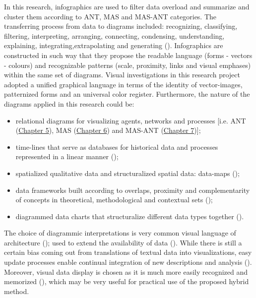 \documentclass[11pt]{report}
\begin{document}
In this research, infographics are used to filter data overload and summarize and cluster them according to ANT, MAS and MAS-ANT categories.
The transferring process from data to diagrams included: recognizing, classifying, filtering, interpreting, arranging, connecting, condensing, understanding, explaining, integrating,extrapolating and generating (\href{McCandless}{\citealt{McCandless}}).
Infographics are constructed in such way that they propose the readable  language (forms - vectors - colours) and recognizable patterns (scale, proximity, links and visual emphases) within the same set of diagrams.
Visual investigations in this research project adopted a unified graphical language in terms of the identity of vector-images, patternized forms and an universal color register.
Furthermore, the nature of the diagrams applied in this research could be:
\begin{itemize}
\item relational diagrams for visualizing agents, networks and processes [i.e. ANT (\href{Chapter 5}{Chapter 5}), MAS (\href{Chapter 6}{Chapter 6}) and MAS-ANT (\href{Chapter 7}{Chapter 7})];
\item time-lines that serve as databases for historical data and processes represented in a linear manner (\href{Rosenberg}{\citealt{Rosenberg and Grafton}});
\item spatialized qualitative data and structuralized spatial data: data-maps (\href{Raisson}{\citealt{Raisson}});
\item data frameworks built according to overlaps, proximity and complementarity of concepts in theoretical, methodological and contextual sets (\href{Caraes}{\citealt{Caraes et al.}});
\item diagrammed data charts that structuralize different data types together (\href{Yau}{\citealt{Yau}}).
\end{itemize}

The choice of diagrammic interpretations is very common visual language of architecture (\href{Chaplin}{\citealt{Chaplin}}); used to extend the availability of data (\href{Hemmersam}{\citealt{Hemmersam et al}}).
While there is still a certain bias coming out from translations of textual data into visualizations, easy update processes enable continual integration of new descriptions and analysis (\href{Tufte}{\citealt{Tufte}}). 
Moreover, visual data display is chosen as it is much more easily recognized and memorized (\href{Krum}{\citealt{Krum}}), which may be very useful for practical use of the proposed hybrid method.
\end{document}
